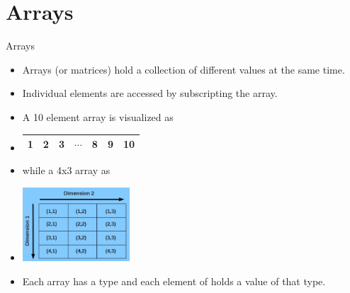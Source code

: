 \documentclass[c,mathserif,compress,xcolor=svgnames]{beamer}
\begin{document}
\section{Arrays}
\begin{frame}{Arrays}
  \begin{itemize}
    \item Arrays (or matrices) hold a collection of different values at the same time.
    \item Individual elements are accessed by subscripting the array.
    \item A 10 element array is visualized as
    \item[]
      \begin{center}
        \begin{tabular}{|c|c|c|c|c|c|c|}
          \hline
          1 & 2 & 3 & $\cdots$ & 8 & 9 & 10 \\
          \hline
        \end{tabular}
      \end{center}
    \item[] while a 4x3 array as
    \item[]
      \begin{center}
        \includegraphics[width=4cm]{./array1}
      \end{center}
    \item Each array has a type and each element of holds a value of that type.
  \end{itemize}
\end{frame} 
\end{document}
